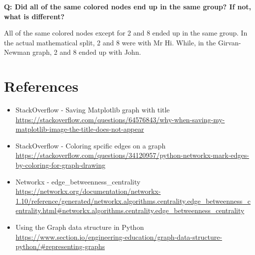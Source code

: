 \documentclass[12pt]{article}
\begin{document}
\noindent\textbf{Q: Did all of the same colored nodes end up in the same group? If not, what is different?}

All of the same colored nodes except for 2 and 8 ended up in the same group. In the actual mathematical split, 2 and 8 were with Mr Hi. While, in the Girvan-Newman graph, 2 and 8 ended up with John.

\section*{References}

\begin{itemize}
    \item{StackOverflow - Saving Matplotlib graph with title} \url{https://stackoverflow.com/questions/64576843/why-when-saving-my-matplotlib-image-the-title-does-not-appear}
    \item{StackOverflow - Coloring spcific edges on a graph} \url{https://stackoverflow.com/questions/34120957/python-networkx-mark-edges-by-coloring-for-graph-drawing}
    \item{Networkx - edge\_betweenness\_centrality} \url{https://networkx.org/documentation/networkx-1.10/reference/generated/networkx.algorithms.centrality.edge_betweenness_centrality.html#networkx.algorithms.centrality.edge_betweenness_centrality}
    \item{Using the Graph data structure in Python} \url{https://www.section.io/engineering-education/graph-data-structure-python/#representing-graphs}
\end{itemize}
\end{document}

